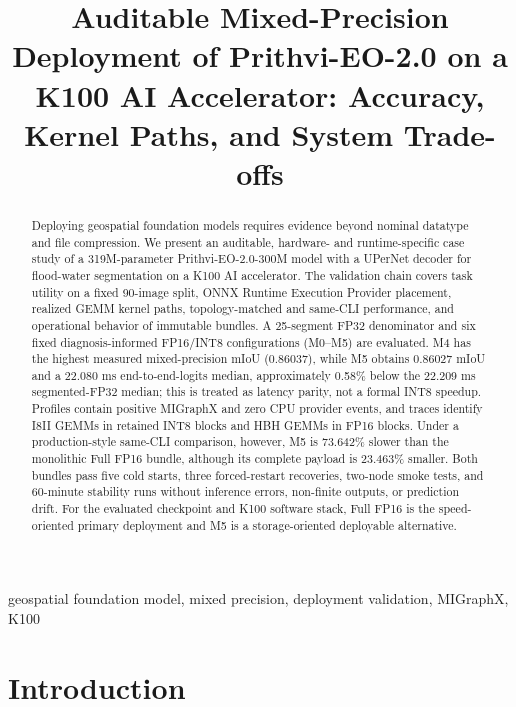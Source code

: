 \documentclass[conference]{IEEEtran}
\begin{document}
\title{Auditable Mixed-Precision Deployment of Prithvi-EO-2.0 on a K100 AI Accelerator: Accuracy, Kernel Paths, and System Trade-offs}

\author{
}

\maketitle

\begin{abstract}
Deploying geospatial foundation models requires evidence beyond nominal datatype and file compression. We present an auditable, hardware- and runtime-specific case study of a 319M-parameter Prithvi-EO-2.0-300M model with a UPerNet decoder for flood-water segmentation on a K100 AI accelerator. The validation chain covers task utility on a fixed 90-image split, ONNX Runtime Execution Provider placement, realized GEMM kernel paths, topology-matched and same-CLI performance, and operational behavior of immutable bundles. A 25-segment FP32 denominator and six fixed diagnosis-informed FP16/INT8 configurations (M0--M5) are evaluated. M4 has the highest measured mixed-precision mIoU (0.86037), while M5 obtains 0.86027 mIoU and a 22.080 ms end-to-end-logits median, approximately 0.58\% below the 22.209 ms segmented-FP32 median; this is treated as latency parity, not a formal INT8 speedup. Profiles contain positive MIGraphX and zero CPU provider events, and traces identify I8II GEMMs in retained INT8 blocks and HBH GEMMs in FP16 blocks. Under a production-style same-CLI comparison, however, M5 is 73.642\% slower than the monolithic Full FP16 bundle, although its complete payload is 23.463\% smaller. Both bundles pass five cold starts, three forced-restart recoveries, two-node smoke tests, and 60-minute stability runs without inference errors, non-finite outputs, or prediction drift. For the evaluated checkpoint and K100 software stack, Full FP16 is the speed-oriented primary deployment and M5 is a storage-oriented deployable alternative.
\end{abstract}

\begin{IEEEkeywords}
geospatial foundation model, mixed precision, deployment validation, MIGraphX, K100
\end{IEEEkeywords}

\section{Introduction}
\label{sec:introduction}
\end{document}
